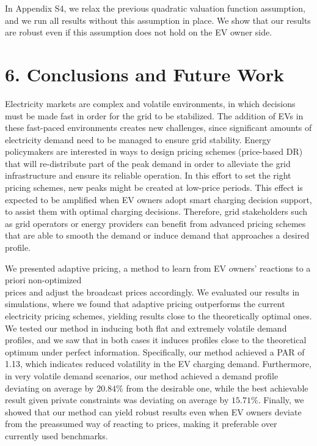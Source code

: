 \documentclass[10pt]{article}
\begin{document}
In Appendix S4, we relax the previous quadratic valuation function assumption, and we run all results without this assumption in place. We show that our results are robust even if this assumption does not hold on the EV owner side.

\section*{6. Conclusions and Future Work}
Electricity markets are complex and volatile environments, in which decisions must be made fast in order for the grid to be stabilized. The addition of EVs in these fast-paced environments creates new challenges, since significant amounts of electricity demand need to be managed to ensure grid stability. Energy policymakers are interested in ways to design pricing schemes (price-based DR) that will re-distribute part of the peak demand in order to alleviate the grid infrastructure and ensure its reliable operation. In this effort to set the right pricing schemes, new peaks might be created at low-price periods. This effect is expected to be amplified when EV owners adopt smart charging decision support, to assist them with optimal charging decisions. Therefore, grid stakeholders such as grid operators or energy providers can benefit from advanced pricing schemes that are able to smooth the demand or induce demand that approaches a desired profile.

We presented adaptive pricing, a method to learn from EV owners' reactions to a priori non-optimized\\
prices and adjust the broadcast prices accordingly. We evaluated our results in simulations, where we found that adaptive pricing outperforms the current electricity pricing schemes, yielding results close to the theoretically optimal ones. We tested our method in inducing both flat and extremely volatile demand profiles, and we saw that in both cases it induces profiles close to the theoretical optimum under perfect information. Specifically, our method achieved a PAR of 1.13, which indicates reduced volatility in the EV charging demand. Furthermore, in very volatile demand scenarios, our method achieved a demand profile deviating on average by $20.84 \%$ from the desirable one, while the best achievable result given private constraints was deviating on average by $15.71 \%$. Finally, we showed that our method can yield robust results even when EV owners deviate from the preassumed way of reacting to prices, making it preferable over currently used benchmarks.
\end{document}
